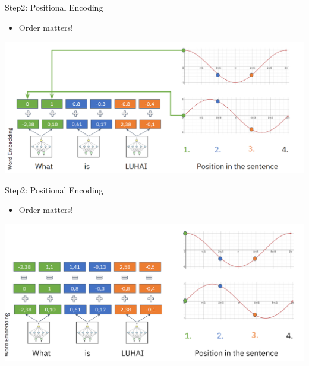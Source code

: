 \documentclass[aspectratio=169]{../latex_main/tntbeamer}  %
\begin{document}
        \begin{frame}{Step2: Positional Encoding}

            \begin{itemize}
                \item Order matters!
            \end{itemize}

            \centering
            \includegraphics[width=0.9\linewidth]{075_deep_learning/figures/transformer4.png}
        
        \end{frame}

        \begin{frame}{Step2: Positional Encoding}

            \begin{itemize}
                \item Order matters!
            \end{itemize}

            \centering
            \includegraphics[width=0.9\linewidth]{075_deep_learning/figures/transformer5.png}
        
        \end{frame}
\end{document}
